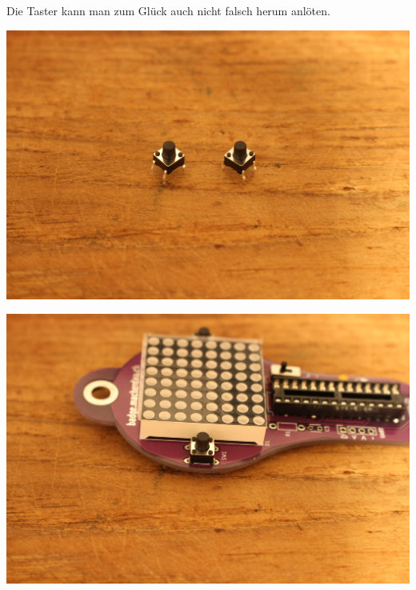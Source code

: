 \documentclass{article}
\begin{document}
Die Taster kann man zum Glück auch nicht falsch herum anlöten.

\vspace{1cm}

\begin{minipage}[b]{0.5\textwidth}
	\includegraphics[width=\textwidth]{Bilder2024/IMG_0066.JPG}
\end{minipage}
\begin{minipage}[b]{0.5\textwidth}
	\includegraphics[width=\textwidth]{Bilder2024/IMG_0067.JPG}
\end{minipage}

\vspace{0.5cm}
\end{document}

